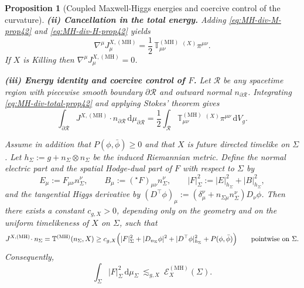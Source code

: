 \documentclass[11pt]{article}
\numberwithin{equation}{section}
\theoremstyle{plain}
\newtheorem{proposition}[theorem]{Proposition}
\theoremstyle{definition}
\theoremstyle{remark}
\newcommand{\dd}{\mathrm{d}}
\begin{document}
\begin{proposition}[Coupled Maxwell-Higgs energies and coercive control of the curvature]
\smallskip
\noindent
\textbf{(ii) Cancellation in the total energy.}
Adding \eqref{eq:MH-div-M-prop42} and \eqref{eq:MH-div-H-prop42} yields
\begin{equation}\label{eq:MH-div-total-prop42}
\nabla^{\mu}J^{X,(\mathrm{MH})}_{\mu}
=
\frac12\,\mathbb T^{(\mathrm{MH})}_{\mu\nu}\;{}^{(X)}\pi^{\mu\nu}.
\end{equation}
If $X$ is Killing then $\nabla^{\mu}J^{X,(\mathrm{MH})}_{\mu}=0$.

\smallskip
\noindent
\textbf{(iii) Energy identity and coercive control of $F$.}
Let $\mathcal R$ be any spacetime region with piecewise smooth boundary $\partial\mathcal R$ and outward normal $n_{\partial\mathcal R}$.
Integrating \eqref{eq:MH-div-total-prop42} and applying Stokes' theorem gives
\begin{equation}\label{eq:MH-stokes-prop42}
\int_{\partial\mathcal R} J^{X,(\mathrm{MH})}\!\cdot n_{\partial\mathcal R}\,\dd\mu_{\partial\mathcal R}
=
\frac12\int_{\mathcal R}\mathbb T^{(\mathrm{MH})}_{\mu\nu}\;{}^{(X)}\pi^{\mu\nu}\,\dd V_{g}.
\end{equation}

Assume in addition that $P(\phi,\bar\phi)\ge0$ and that $X$ is future directed timelike on $\Sigma$.
Let $h_{\Sigma}:=g+n_{\Sigma}\otimes n_{\Sigma}$ be the induced Riemannian metric.
Define the normal electric part and the spatial Hodge-dual part of $F$ with respect to $\Sigma$ by
\begin{equation}\label{eq:MH-EB-decomp}
E_{\mu}:=F_{\mu\nu}n_{\Sigma}^{\nu},
\qquad
B_{\mu}:=({}^{\star}\!F)_{\mu\nu}n_{\Sigma}^{\nu},
\qquad
|F|_{\Sigma}^{2}:=|E|^{2}_{h_{\Sigma}}+|B|^{2}_{h_{\Sigma}},
\end{equation}
and the tangential Higgs derivative by $(D^{\top}\phi)_{\mu}:=(\delta_{\mu}^{\nu}+n_{\Sigma\mu}n_{\Sigma}^{\nu})D_{\nu}\phi$.
Then there exists a constant $c_{g,X}>0$, depending only on the geometry and on the uniform timelikeness of $X$ on $\Sigma$, such that
\begin{equation}\label{eq:MH-coercive-prop42}
J^{X,(\mathrm{MH})}\!\cdot n_{\Sigma}
=
\mathbb T^{(\mathrm{MH})}(n_{\Sigma},X)
\ge
c_{g,X}\Bigl(|F|_{\Sigma}^{2}+|D_{n_{\Sigma}}\phi|^{2}+|D^{\top}\phi|^{2}_{h_{\Sigma}}+P(\phi,\bar\phi)\Bigr)
\qquad\text{pointwise on }\Sigma.
\end{equation}
Consequently,
\begin{equation}\label{eq:MH-bound-F-prop42}
\int_{\Sigma}|F|_{\Sigma}^{2}\,\dd\mu_{\Sigma}\ \lesssim_{g,X}\ \mathcal E^{(\mathrm{MH})}_{X}(\Sigma).
\end{equation}
\end{proposition}
\end{document}
